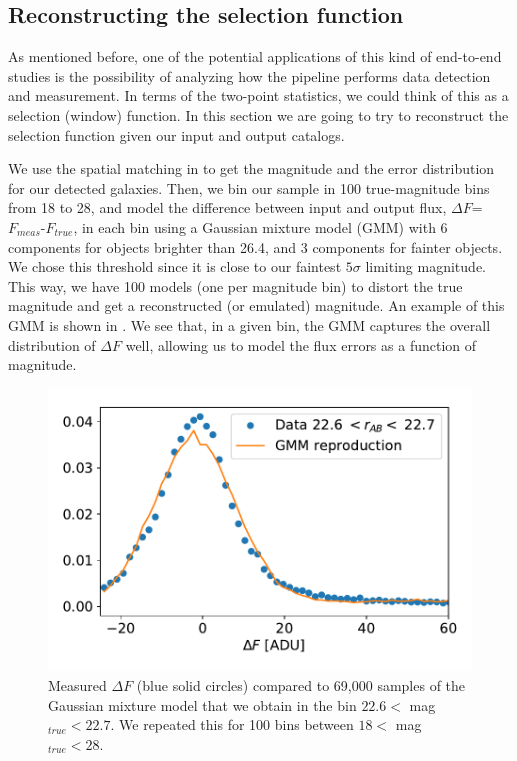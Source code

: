 \documentclass[twocolumn]{aastex62}
\begin{document}
\subsection{Reconstructing the selection function}
As mentioned before, one of the potential applications of this kind of end-to-end studies is the possibility of analyzing how the pipeline performs data detection and measurement. In terms of the two-point statistics, we could think of this as a selection (window) function. In this section we are going to try to reconstruct the selection function given our input and output catalogs.

We use the spatial matching in  to get the magnitude and the error distribution for our detected galaxies. Then, we bin our sample in 100 true-magnitude bins from 18 to 28, and model the difference between input and output flux, $\Delta F$=$F_{meas}$-$F_{true}$, in each bin using a Gaussian mixture model (GMM) with 6 components for objects brighter than 26.4, and 3 components for fainter objects. We chose this threshold since it is close to our faintest $5\sigma$ limiting magnitude. This way, we have 100 models (one per magnitude bin) to distort the true magnitude and get a reconstructed (or emulated) magnitude. An example of this GMM is shown in . We see that, in a given bin, the GMM captures the overall distribution of $\Delta F$ well, allowing us to model the flux errors as a function of magnitude.
\begin{figure}
\centering
\includegraphics[width=0.9\columnwidth]{example_GMM}
\caption{Measured $\Delta F$ (blue solid circles) compared to 69,000 samples of the Gaussian mixture model that we obtain in the bin $22.6 <$ mag$_{true} < 22.7$. We repeated this for 100 bins between $18 <$ mag$_{true} < 28$.}
\label{fig:example_GMM}
\end{figure}
\end{document}
